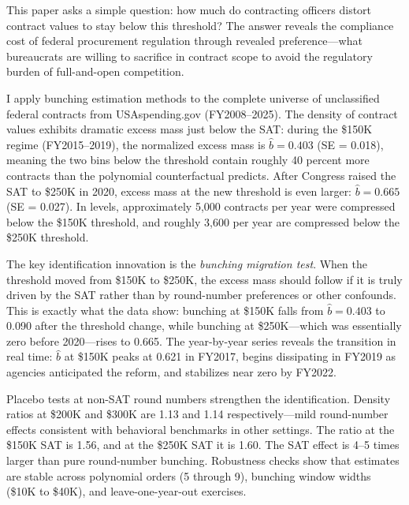 \documentclass[12pt]{article}
\begin{document}
This paper asks a simple question: how much do contracting officers distort contract values to stay below this threshold? The answer reveals the compliance cost of federal procurement regulation through revealed preference---what bureaucrats are willing to sacrifice in contract scope to avoid the regulatory burden of full-and-open competition.

I apply bunching estimation methods \citep{saez2010, chetty2011, kleven2013} to the complete universe of unclassified federal contracts from USAspending.gov (FY2008--2025). The density of contract values exhibits dramatic excess mass just below the SAT: during the \$150K regime (FY2015--2019), the normalized excess mass is $\hat{b} = 0.403$ (SE = 0.018), meaning the two bins below the threshold contain roughly 40 percent more contracts than the polynomial counterfactual predicts. After Congress raised the SAT to \$250K in 2020, excess mass at the new threshold is even larger: $\hat{b} = 0.665$ (SE = 0.027). In levels, approximately 5,000 contracts per year were compressed below the \$150K threshold, and roughly 3,600 per year are compressed below the \$250K threshold.

The key identification innovation is the \textit{bunching migration test}. When the threshold moved from \$150K to \$250K, the excess mass should follow if it is truly driven by the SAT rather than by round-number preferences or other confounds. This is exactly what the data show: bunching at \$150K falls from $\hat{b} = 0.403$ to 0.090 after the threshold change, while bunching at \$250K---which was essentially zero before 2020---rises to 0.665. The year-by-year series reveals the transition in real time: $\hat{b}$ at \$150K peaks at 0.621 in FY2017, begins dissipating in FY2019 as agencies anticipated the reform, and stabilizes near zero by FY2022.

Placebo tests at non-SAT round numbers strengthen the identification. Density ratios at \$200K and \$300K are 1.13 and 1.14 respectively---mild round-number effects consistent with behavioral benchmarks in other settings. The ratio at the \$150K SAT is 1.56, and at the \$250K SAT it is 1.60. The SAT effect is 4--5 times larger than pure round-number bunching. Robustness checks show that estimates are stable across polynomial orders (5 through 9), bunching window widths (\$10K to \$40K), and leave-one-year-out exercises.
\end{document}
